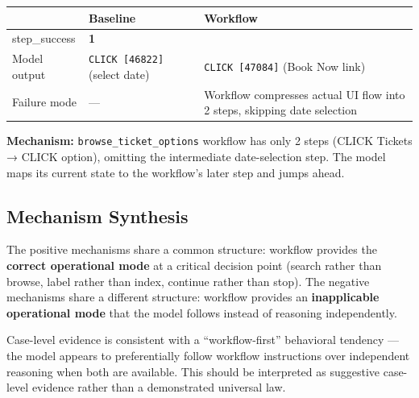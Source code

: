 \documentclass{article}
\begin{document}
{\begin{longtable}[]{@{}
  >{\raggedright\arraybackslash}p{}
  >{\raggedright\arraybackslash}p{}
  >{\raggedright\arraybackslash}p{}@{}}
\toprule\noalign{}
\begin{minipage}[b]{\linewidth}\raggedright
\end{minipage} & \begin{minipage}[b]{\linewidth}\raggedright
Baseline
\end{minipage} & \begin{minipage}[b]{\linewidth}\raggedright
Workflow
\end{minipage} \\
\midrule\noalign{}
\endhead
\bottomrule\noalign{}
\endlastfoot
step\_success & \textbf{1} & 0 \\
Model output & \texttt{CLICK\ {[}46822{]}} (select date) &
\texttt{CLICK\ {[}47084{]}} (Book Now link) \\
Failure mode & --- & Workflow compresses actual UI flow into 2 steps,
skipping date selection \\
\end{longtable}
}

\textbf{Mechanism:} \texttt{browse\_ticket\_options} workflow has only 2
steps (CLICK Tickets → CLICK option), omitting the intermediate
date-selection step. The model maps its current state to the workflow's
later step and jumps ahead.

\subsection{Mechanism Synthesis}\label{mechanism-synthesis}

The positive mechanisms share a common structure: workflow provides the
\textbf{correct operational mode} at a critical decision point (search
rather than browse, label rather than index, continue rather than stop).
The negative mechanisms share a different structure: workflow provides
an \textbf{inapplicable operational mode} that the model follows instead
of reasoning independently.

Case-level evidence is consistent with a ``workflow-first'' behavioral
tendency --- the model appears to preferentially follow workflow
instructions over independent reasoning when both are available. This
should be interpreted as suggestive case-level evidence rather than a
demonstrated universal law.
\end{document}
